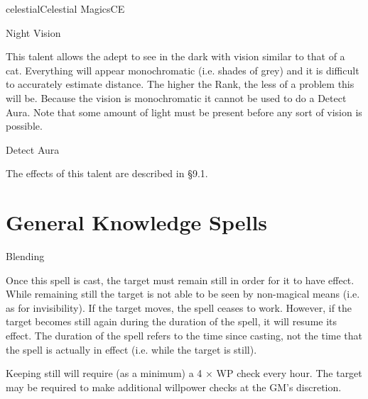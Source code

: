 \begin{College}[1.3]{celestial}{Celestial Magics}{CE}
\begin{talent}[T-2]{Night Vision}

\begin{effects}
This  talent  allows  the  adept  to  see  in  the 
dark with vision similar to that of a cat. Everything 
will  appear  monochromatic  (i.e.  shades  of  grey) 
and  it  is  difficult  to  accurately  estimate  distance. 
The higher the Rank, the less of a problem this will 
be. Because the vision is monochromatic it cannot 
be  used  to  do  a  Detect  Aura.  Note  that  some 
amount of light must be present before any sort of 
vision is possible. 
\end{effects}
\end{talent}

\begin{talent}[T-3]{Detect Aura }

\begin{effects}
 The  effects  of  this  talent  are  described  in 
§9.1. 
\end{effects}
\end{talent}


\section{General Knowledge Spells}

\begin{spell}[G-1]{Blending }

\begin{effects}
Once this spell is cast, the target must remain still in order for it
to have effect.  While remaining still the target is not able to be
seen by non-magical means (i.e.  as for invisibility).  If the target
moves, the spell ceases to work. However, if the target becomes still
again during the duration of the spell, it will resume its effect.
The duration of the spell refers to the time since casting, not the
time that the spell is actually in effect (i.e.  while the target is
still).

Keeping still will require (as a minimum) a 4 × WP 
check  every  hour.  The  target  may  be  required  to 
make  additional  willpower  checks  at  the  GM’s 
discretion. 


\end{effects}
\end{spell}
\end{College}
